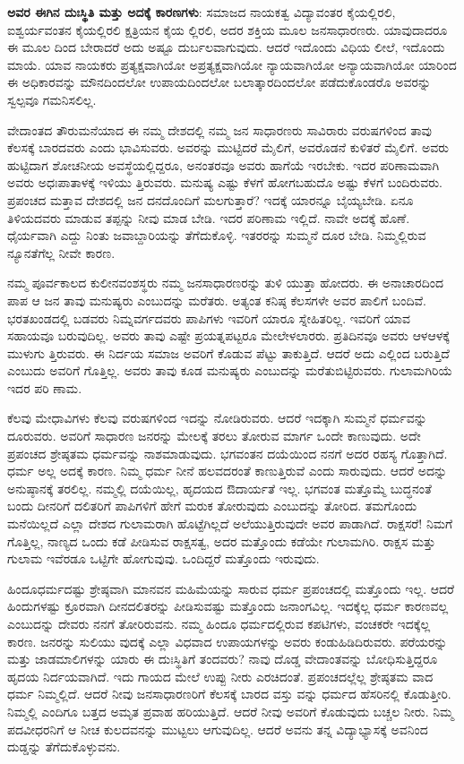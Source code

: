 \textbf{ಅವರ ಈಗಿನ ದುಃಸ್ಥಿತಿ ಮತ್ತು ಅದಕ್ಕೆ ಕಾರಣಗಳು}: ಸಮಾಜದ ನಾಯಕತ್ವ ವಿದ್ಯಾವಂತರ ಕೈಯಲ್ಲಿರಲಿ, ಐಶ್ವರ್ಯವಂತನ ಕೈಯಲ್ಲಿರಲಿ ಕ್ಷತ್ರಿಯನ ಕೈಯ ಲ್ಲಿರಲಿ, ಅದರ ಶಕ್ತಿಯ ಮೂಲ ಜನಸಾಧಾರಣರು. ಯಾವುದಾದರೂ ಈ ಮೂಲ ದಿಂದ ಬೇರಾದರೆ ಅದು ಅಷ್ಟೂ ದುರ್ಬಲವಾಗುವುದು. ಆದರೆ ಇದೊಂದು ವಿಧಿಯ ಲೀಲೆ, ಇದೊಂದು ಮಾಯೆ. ಯಾವ ನಾಯಕರು ಪ್ರತ್ಯಕ್ಷವಾಗಿಯೋ ಅಪ್ರತ್ಯಕ್ಷವಾಗಿಯೋ ನ್ಯಾಯವಾಗಿಯೋ ಅನ್ಯಾಯವಾಗಿಯೋ ಯಾರಿಂದ ಈ ಅಧಿಕಾರವನ್ನು ಮೌನದಿಂದಲೋ ಉಪಾಯದಿಂದಲೋ ಬಲಾತ್ಕಾರದಿಂದಲೋ ಪಡೆದುಕೊಂಡರೊ ಅವರನ್ನು ಸ್ವಲ್ಪವೂ ಗಮನಿಸಲಿಲ್ಲ.

ವೇದಾಂತದ ತೌರುಮನೆಯಾದ ಈ ನಮ್ಮ ದೇಶದಲ್ಲಿ ನಮ್ಮ ಜನ ಸಾಧಾರಣರು ಸಾವಿರಾರು ವರುಷಗಳಿಂದ ತಾವು ಕೆಲಸಕ್ಕೆ ಬಾರದವರು ಎಂದು ಭಾವಿಸುವರು. ಅವರನ್ನು ಮುಟ್ಟಿದರೆ ಮೈಲಿಗೆ, ಅವರೊಡನೆ ಕುಳಿತರೆ ಮೈಲಿಗೆ. ಅವರು ಹುಟ್ಟಿದಾಗ ಶೋಚನೀಯ ಅವಸ್ಥೆಯಲ್ಲಿದ್ದರೂ, ಅನಂತರವೂ ಅವರು ಹಾಗೆಯೆ ಇರಬೇಕು. ಇದರ ಪರಿಣಾಮವಾಗಿ ಅವರು ಅಧಃಪಾತಾಳಕ್ಕೆ ಇಳಿಯು ತ್ತಿರುವರು. ಮನುಷ್ಯ ಎಷ್ಟು ಕೆಳಗೆ ಹೋಗಬಹುದೊ ಅಷ್ಟು ಕೆಳಗೆ ಬಂದಿರುವರು. ಪ್ರಪಂಚದ ಮತ್ತಾವ ದೇಶದಲ್ಲಿ ಜನ ದನದೊಂದಿಗೆ ಮಲಗುತ್ತಾರೆ? ಇದಕ್ಕೆ ಯಾರನ್ನೂ ಬೈಯ್ಯಬೇಡಿ. ಏನೂ ತಿಳಿಯದವರು ಮಾಡುವ ತಪ್ಪನ್ನು ನೀವು ಮಾಡ ಬೇಡಿ. ಇದರ ಪರಿಣಾಮ ಇಲ್ಲಿದೆ. ನಾವೇ ಅದಕ್ಕೆ ಹೊಣೆ. ಧೈರ್ಯವಾಗಿ ಎದ್ದು ನಿಂತು ಜವಾಬ್ದಾರಿಯನ್ನು ತೆಗೆದುಕೊಳ್ಳಿ. ಇತರರನ್ನು ಸುಮ್ಮನೆ ದೂರ ಬೇಡಿ. ನಿಮ್ಮಲ್ಲಿರುವ ನ್ಯೂನತೆಗೆಲ್ಲ ನೀವೇ ಕಾರಣ.

ನಮ್ಮ ಪೂರ್ವಕಾಲದ ಕುಲೀನವಂಶಸ್ಥರು ನಮ್ಮ ಜನಸಾಧಾರಣರನ್ನು ತುಳಿ ಯುತ್ತಾ ಹೋದರು. ಈ ಅನಾಚಾರದಿಂದ ಪಾಪ ಆ ಜನ ತಾವು ಮನುಷ್ಯರು ಎಂಬುದನ್ನು ಮರೆತರು. ಅತ್ಯಂತ ಕನಿಷ್ಠ ಕೆಲಸಗಳೇ ಅವರ ಪಾಲಿಗೆ ಬಂದಿವೆ. ಭರತಖಂಡದಲ್ಲಿ ಬಡವರು ನಿಮ್ನವರ್ಗದವರು ಪಾಪಿಗಳು ಇವರಿಗೆ ಯಾರೂ ಸ್ನೇಹಿತರಿಲ್ಲ. ಇವರಿಗೆ ಯಾವ ಸಹಾಯವೂ ಬರುವುದಿಲ್ಲ. ಅವರು ತಾವು ಎಷ್ಟೇ ಪ್ರಯತ್ನಪಟ್ಟರೂ ಮೇಲೇಳಲಾರರು. ಪ್ರತಿದಿನವೂ ಅವರು ಆಳಆಳಕ್ಕೆ ಮುಳುಗು ತ್ತಿರುವರು. ಈ ನಿರ್ದಯ ಸಮಾಜ ಅವರಿಗೆ ಕೊಡುವ ಪೆಟ್ಟು ತಾಕುತ್ತಿದೆ. ಆದರೆ ಅದು ಎಲ್ಲಿಂದ ಬರುತ್ತಿದೆ ಎಂಬುದು ಅವರಿಗೆ ಗೊತ್ತಿಲ್ಲ. ಅವರು ತಾವು ಕೂಡ ಮನುಷ್ಯರು ಎಂಬುದನ್ನು ಮರೆತುಬಿಟ್ಟಿರುವರು. ಗುಲಾಮಗಿರಿಯೆ ಇದರ ಪರಿ ಣಾಮ.

ಕೆಲವು ಮೇಧಾವಿಗಳು ಕೆಲವು ವರುಷಗಳಿಂದ ಇದನ್ನು ನೋಡಿರುವರು. ಆದರೆ ಇದಕ್ಕಾಗಿ ಸುಮ್ಮನೆ ಧರ್ಮವನ್ನು ದೂರುವರು. ಅವರಿಗೆ ಸಾಧಾರಣ ಜನರನ್ನು ಮೇಲಕ್ಕೆ ತರಲು ತೋರುವ ಮಾರ್ಗ ಒಂದೇ ಕಾಣುವುದು. ಅದೇ ಪ್ರಪಂಚದ ಶ್ರೇಷ್ಠತಮ ಧರ್ಮವನ್ನು ನಾಶಮಾಡುವುದು. ಭಗವಂತನ ದಯೆಯಿಂದ ನನಗೆ ಅದರ ರಹಸ್ಯ ಗೊತ್ತಾಗಿದೆ. ಧರ್ಮ ಅಲ್ಲ ಅದಕ್ಕೆ ಕಾರಣ. ನಿಮ್ಮ ಧರ್ಮ ನೀನೆ ಹಲವದರಂತೆ ಕಾಣುತ್ತಿರುವೆ ಎಂದು ಸಾರುವುದು. ಆದರೆ ಅದನ್ನು ಅನುಷ್ಠಾನಕ್ಕೆ ತರಲಿಲ್ಲ. ನಮ್ಮಲ್ಲಿ ದಯೆಯಿಲ್ಲ, ಹೃದಯದ ಔದಾರ್ಯತೆ ಇಲ್ಲ. ಭಗವಂತ ಮತ್ತೊಮ್ಮೆ ಬುದ್ಧನಂತೆ ಬಂದು ದೀನರಿಗೆ ದಲಿತರಿಗೆ ಪಾಪಿಗಳಿಗೆ ಹೇಗೆ ಮರುಕ ತೋರುವುದು ಎಂಬುದನ್ನು ತೋರಿದ. ತಮಗೊಂದು ಮನೆಯಿಲ್ಲದೆ ಎಲ್ಲಾ ದೇಶದ ಗುಲಾಮರಾಗಿ ಹೊಟ್ಟೆಗಿಲ್ಲದೆ ಅಲೆಯುತ್ತಿರುವುದೇ ಅವರ ಪಾಡಾಗಿದೆ. ರಾಕ್ಷಸರೆ! ನಿಮಗೆ ಗೊತ್ತಿಲ್ಲ, ನಾಣ್ಯದ ಒಂದು ಕಡೆ ಪೀಡಿಸುವ ರಾಕ್ಷಸತ್ವ, ಅದರ ಮತ್ತೊಂದು ಕಡೆಯೇ ಗುಲಾಮಗಿರಿ. ರಾಕ್ಷಸ ಮತ್ತು ಗುಲಾಮ ಇವೆರಡೂ ಒಟ್ಟಿಗೇ ಹೋಗುವುವು. ಒಂದಿದ್ದರೆ ಮತ್ತೊಂದು ಇರುವುದು.

ಹಿಂದೂಧರ್ಮದಷ್ಟು ಶ್ರೇಷ್ಠವಾಗಿ ಮಾನವನ ಮಹಿಮೆಯನ್ನು ಸಾರುವ ಧರ್ಮ ಪ್ರಪಂಚದಲ್ಲಿ ಮತ್ತೊಂದು ಇಲ್ಲ. ಆದರೆ ಹಿಂದುಗಳಷ್ಟು ಕ್ರೂರವಾಗಿ ದೀನದಲಿತರನ್ನು ಪೀಡಿಸುವಷ್ಟು ಮತ್ತೊಂದು ಜನಾಂಗವಿಲ್ಲ. ಇದಕ್ಕೆಲ್ಲ ಧರ್ಮ ಕಾರಣವಲ್ಲ ಎಂಬುದನ್ನು ದೇವರು ನನಗೆ ತೋರಿರುವನು. ನಮ್ಮ ಹಿಂದೂ ಧರ್ಮದಲ್ಲಿರುವ ಕಪಟಿಗಳು, ವಂಚಕರೇ ಇದಕ್ಕೆಲ್ಲ ಕಾರಣ. ಜನರನ್ನು ಸುಲಿಯು ವುದಕ್ಕೆ ಎಲ್ಲಾ ವಿಧವಾದ ಉಪಾಯಗಳನ್ನು ಅವರು ಕಂಡುಹಿಡಿದಿರುವರು. ಪರೆಯರನ್ನು ಮತ್ತು ಜಾಡಮಾಲಿಗಳನ್ನು ಯಾರು ಈ ದುಃಸ್ಥಿತಿಗೆ ತಂದವರು? ನಾವು ದೊಡ್ಡ ವೇದಾಂತವನ್ನು ಬೋಧಿಸುತ್ತಿದ್ದರೂ ಹೃದಯ ನಿರ್ದಯವಾಗಿದೆ. ಇದು ಗಾಯದ ಮೇಲೆ ಉಪ್ಪು ನೀರು ಎರಚಿದಂತೆ. ಪ್ರಪಂಚದಲ್ಲೆಲ್ಲ ಶ್ರೇಷ್ಠತಮ ವಾದ ಧರ್ಮ ನಿಮ್ಮಲ್ಲಿದೆ. ಆದರೆ ನೀವು ಜನಸಾಧಾರಣರಿಗೆ ಕೆಲಸಕ್ಕೆ ಬಾರದ ವಸ್ತು ವನ್ನು ಧರ್ಮದ ಹೆಸರಿನಲ್ಲಿ ಕೊಡುತ್ತೀರಿ. ನಿಮ್ಮಲ್ಲಿ ಎಂದಿಗೂ ಬತ್ತದ ಅಮೃತ ಪ್ರವಾಹ ಹರಿಯುತ್ತಿದೆ. ಆದರೆ ನೀವು ಅವರಿಗೆ ಕೊಡುವುದು ಬಚ್ಚಲ ನೀರು. ನಿಮ್ಮ ಪದವೀಧರನಿಗೆ ಆ ನೀಚ ಕುಲದವನನ್ನು ಮುಟ್ಟಲು ಆಗುವುದಿಲ್ಲ. ಆದರೆ ಅವನು ತನ್ನ ವಿದ್ಯಾಭ್ಯಾಸಕ್ಕೆ ಅವನಿಂದ ದುಡ್ಡನ್ನು ತೆಗೆದುಕೊಳ್ಳುವನು.

